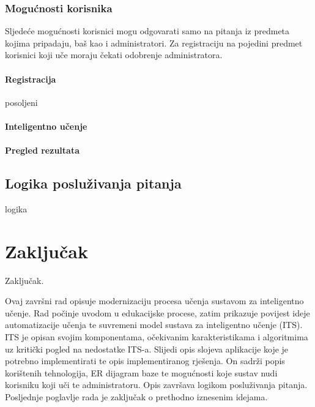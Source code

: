 \documentclass[times, utf8, zavrsni]{fer}
\begin{document}
\subsection{Mogućnosti korisnika}
Sljedeće mogućnosti korisnici mogu odgovarati samo na pitanja iz predmeta kojima pripadaju, baš kao i administratori. Za registraciju na pojedini predmet korisnici koji uče moraju čekati odobrenje administratora.

\subsubsection{Registracija}
posoljeni

\subsubsection{Inteligentno učenje}

\subsubsection{Pregled rezultata}

\section{Logika posluživanja pitanja}
logika

\chapter{Zaključak}
Zaključak.




\begin{sazetak}
Ovaj završni rad opisuje modernizaciju procesa učenja sustavom za inteligentno učenje. Rad počinje uvodom u edukacijske procese, zatim prikazuje povijest ideje automatizacije učenja te suvremeni model sustava za inteligentno učenje (ITS). ITS je opisan svojim komponentama, očekivanim karakteristikama i algoritmima uz kritički pogled na nedostatke ITS-a. Slijedi opis slojeva aplikacije koje je potrebno implementirati te opis implementiranog rješenja. On sadrži popis korištenih tehnologija, ER dijagram baze te mogućnosti koje sustav nudi korisniku koji uči te administratoru. Opis završava logikom posluživanja pitanja. Posljednje poglavlje rada je zaključak o prethodno iznesenim idejama. 

\end{sazetak}
\end{document}
